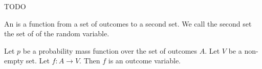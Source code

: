 
\sbasic

























\sstart
{}


TODO


An 
is a function from a
set of outcomes to a second
set.
We call the second set the
set of  of the random
variable.


Let $p$ be a probability mass function
over the set of outcomes $A$.
Let $V$ be a non-empty set.
Let $f : A \to V$.
Then $f$ is an outcome variable.
\strats
